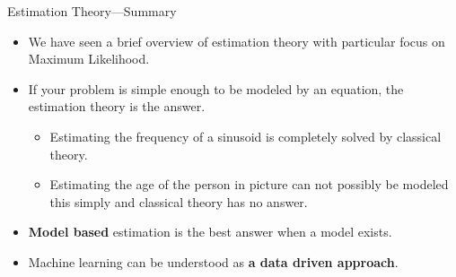 \documentclass[10pt, aspectratio=169]{beamer} %
\begin{document}
\begin{frame}{Estimation Theory---Summary}
\begin{itemize}
\item We have seen a brief overview of estimation theory with particular focus on Maximum Likelihood.
\item If your problem is simple enough to be modeled by an equation, the estimation theory is the answer.
\begin{itemize}
\item Estimating the frequency of a sinusoid is completely solved by classical theory.
\item Estimating the age of the person in picture can not possibly be modeled this simply and classical theory has no answer.
\end{itemize}
\item \textbf{Model based }estimation is the best answer when a model exists.
\item Machine learning can be understood as \textbf{a data driven approach}.
\end{itemize}
\end{frame}
\end{document}
